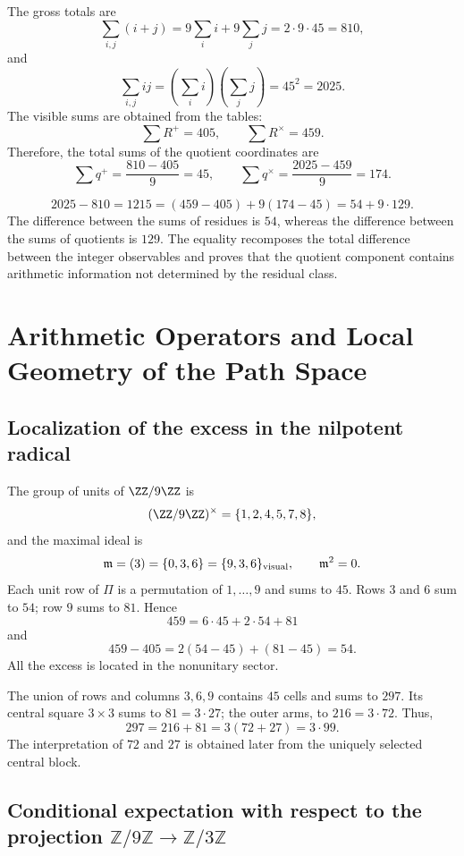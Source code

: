 The gross totals are
\[
\sum_{i,j}(i+j)
=9\sum_i i+9\sum_j j
=2\cdot9\cdot45
=810,
\]
and
\[
\sum_{i,j}ij
=\left(\sum_i i\right)\left(\sum_j j\right)
=45^2
=2025.
\]
The visible sums are obtained from the tables:
\[
\sum R^+=405,
\qquad
\sum R^\times=459.
\]
Therefore, the total sums of the quotient coordinates are
\[
\sum q^+=\frac{810-405}{9}=45,
\qquad
\sum q^\times=\frac{2025-459}{9}=174.
\]

\begin{exactbox}[title={Decomposition exacta of the difference integrada}]
\[
\boxed{
2025-810
=1215
=(459-405)+9(174-45)
=54+9\cdot129.}
\]
The difference between the sums of residues is \(54\), whereas the
difference between the sums of quotients is \(129\). The equality recomposes the
total difference between the integer observables and proves that the quotient
component contains arithmetic information not determined by the residual
class.
\end{exactbox}

\fi

\ifdefined\HMTAPPDevelopments
\chapter{Arithmetic Operators and Local Geometry of the Path Space}
\label{chap:app-operadores}

\section{Localization of the excess in the nilpotent radical}

The group of units of \(\ZZ/9\ZZ\) is
\[
(\ZZ/9\ZZ)^\times=\{1,2,4,5,7,8\},
\]
and the maximal ideal is
\[
\mathfrak m=(3)=\{0,3,6\}=\{9,3,6\}_{\rm visual},
\qquad\mathfrak m^2=0.
\]
Each unit row of \(\Pi\) is a permutation of \(1,\ldots,9\) and sums to
\(45\). Rows \(3\) and \(6\) sum to \(54\); row \(9\) sums to \(81\).
Hence
\[
459=6\cdot45+2\cdot54+81
\]
and
\[
459-405=2(54-45)+(81-45)=54.
\]
All the excess is located in the nonunitary sector.

The union of rows and columns \(3,6,9\) contains \(45\) cells and sums to
\(297\). Its central square \(3\times3\) sums to \(81=3\cdot27\); the outer
arms, to \(216=3\cdot72\). Thus,
\[
297=216+81=3(72+27)=3\cdot99.
\]
The interpretation of \(72\) and \(27\) is obtained later from the
uniquely selected central block.

\section{Conditional expectation with respect to the projection \(\mathbb Z/9\mathbb Z\to\mathbb Z/3\mathbb Z\)}

